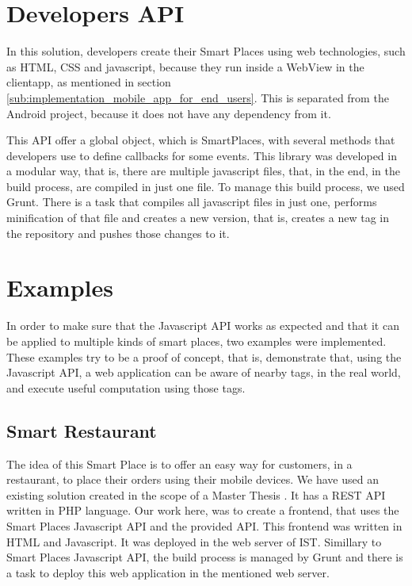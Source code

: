 \section{Developers API}
\label{sec:implementation_developers_api}
In this solution, developers create their Smart Places using web technologies, such as \gls{HTML}, \gls{CSS} and javascript, because they run inside a WebView in the clientapp, as mentioned in section \ref{sub:implementation_mobile_app_for_end_users}.
This is separated from the Android project, because it does not have any dependency from it.

This \gls{API} offer a global object, which is SmartPlaces, with several methods that developers use to define callbacks for some events.
This library was developed in a modular way, that is, there are multiple javascript files, that, in the end, in the build process, are compiled in just one file.
To manage this build process, we used Grunt. There is a task that compiles all javascript files in just one, performs minification of that file and creates a new version, that is, creates a new tag in the repository and pushes those changes to it.

\section{Examples}
\label{sec:implementation_examples}
In order to make sure that the Javascript \gls{API} works as expected and that it can be applied to multiple kinds of smart places, two examples were implemented.
These examples try to be a proof of concept, that is, demonstrate that, using the Javascript API, a web application can be aware of nearby tags, in the real world, and execute useful computation using those tags.

\subsection{Smart Restaurant}
\label{sub:implementation_smart_restaurant}
The idea of this Smart Place is to offer an easy way for customers, in a restaurant, to place their orders using their mobile devices.
We have used an existing solution created in the scope of a Master Thesis \cite{SLOC}.
It has a \gls{REST} \gls{API} written in \gls{PHP} language.
Our work here, was to create a frontend, that uses the Smart Places Javascript \gls{API} and the provided \gls{API}.
This frontend was written in \gls{HTML} and Javascript.
It was deployed in the web server of \gls{IST}. Simillary to Smart Places Javascript \gls{API}, the build process is managed by Grunt and there is a task to deploy this web application in the mentioned web server.

